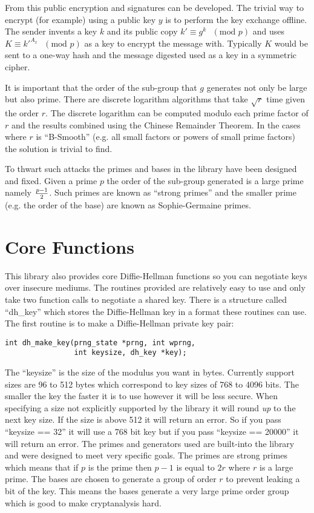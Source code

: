 \documentclass[b5paper]{book}
\begin{document}
From this public encryption and signatures can be developed.  The trivial way to encrypt (for example) using a public key 
$y$ is to perform the key exchange offline.  The sender invents a key $k$ and its public copy 
$k' \equiv g^k\mbox{ }(\mbox{mod }p)$ and uses $K \equiv k'^{A_x}\mbox{ }(\mbox{mod }p)$ as a key to encrypt
the message with.  Typically $K$ would be sent to a one-way hash and the message digested used as a key in a 
symmetric cipher.

It is important that the order of the sub-group that $g$ generates not only be large but also prime.  There are
discrete logarithm algorithms that take $\sqrt r$ time given the order $r$.  The discrete logarithm can be computed
modulo each prime factor of $r$ and the results combined using the Chinese Remainder Theorem.  In the cases where 
$r$ is ``B-Smooth'' (e.g. all small factors or powers of small prime factors) the solution is trivial to find.

To thwart such attacks the primes and bases in the library have been designed and fixed.  Given a prime $p$ the order of
 the sub-group generated is a large prime namely ${p - 1} \over 2$.  Such primes are known as ``strong primes'' and the 
smaller prime (e.g. the order of the base) are known as Sophie-Germaine primes.

\section{Core Functions}

This library also provides core Diffie-Hellman functions so you can negotiate keys over insecure mediums.  The routines 
provided are relatively easy to use and only take two function calls to negotiate a shared key.  There is a structure
called ``dh\_key'' which stores the Diffie-Hellman key in a format these routines can use.  The first routine is to
make a Diffie-Hellman private key pair:
\begin{verbatim}
int dh_make_key(prng_state *prng, int wprng, 
                int keysize, dh_key *key);
\end{verbatim}
The ``keysize'' is the size of the modulus you want in bytes.  Currently support sizes are 96 to 512 bytes which correspond 
to key sizes of 768 to 4096 bits. The smaller the key the faster it is to use however it will be less secure.  When 
specifying a size not explicitly supported by the library it will round {\em up} to the next key size.  If the size is 
above 512 it will return an error.  So if you pass ``keysize == 32'' it will use a 768 bit key but if you pass 
``keysize == 20000'' it will return an error.  The primes and generators used are built-into the library and were designed 
to meet very specific goals.  The primes are strong primes which means that if $p$ is the prime then
$p-1$ is equal to $2r$ where $r$ is a large prime.  The bases are chosen to generate a group of order $r$ to prevent
leaking a bit of the key.  This means the bases generate a very large prime order group which is good to make cryptanalysis
hard.
\end{document}
